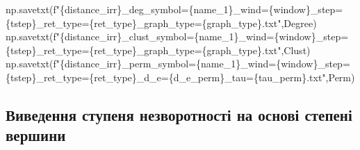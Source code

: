 \documentclass[
  letterpaper,
]{report}
\newenvironment{Shaded}{\begin{snugshade}}{\end{snugshade}}
\newcommand{\NormalTok}[1]{\textcolor[rgb]{0.00,0.23,0.31}{#1}}
\newcommand{\SpecialCharTok}[1]{\textcolor[rgb]{0.37,0.37,0.37}{#1}}
\newcommand{\SpecialStringTok}[1]{\textcolor[rgb]{0.13,0.47,0.30}{#1}}
\begin{document}
\begin{Shaded}
\begin{Highlighting}[]
\NormalTok{np.savetxt(}\SpecialStringTok{f"}\SpecialCharTok{\{}\NormalTok{distance\_irr}\SpecialCharTok{\}}\SpecialStringTok{\_deg\_symbol=}\SpecialCharTok{\{}\NormalTok{name\_1}\SpecialCharTok{\}}\SpecialStringTok{\_wind=}\SpecialCharTok{\{}\NormalTok{window}\SpecialCharTok{\}}\SpecialStringTok{\_step=}\SpecialCharTok{\{}\NormalTok{tstep}\SpecialCharTok{\}}\SpecialStringTok{\_ret\_type=}\SpecialCharTok{\{}\NormalTok{ret\_type}\SpecialCharTok{\}}\SpecialStringTok{\_graph\_type=}\SpecialCharTok{\{}\NormalTok{graph\_type}\SpecialCharTok{\}}\SpecialStringTok{.txt"}\NormalTok{,Degree)}
\NormalTok{np.savetxt(}\SpecialStringTok{f"}\SpecialCharTok{\{}\NormalTok{distance\_irr}\SpecialCharTok{\}}\SpecialStringTok{\_clust\_symbol=}\SpecialCharTok{\{}\NormalTok{name\_1}\SpecialCharTok{\}}\SpecialStringTok{\_wind=}\SpecialCharTok{\{}\NormalTok{window}\SpecialCharTok{\}}\SpecialStringTok{\_step=}\SpecialCharTok{\{}\NormalTok{tstep}\SpecialCharTok{\}}\SpecialStringTok{\_ret\_type=}\SpecialCharTok{\{}\NormalTok{ret\_type}\SpecialCharTok{\}}\SpecialStringTok{\_graph\_type=}\SpecialCharTok{\{}\NormalTok{graph\_type}\SpecialCharTok{\}}\SpecialStringTok{.txt"}\NormalTok{,Clust)}
\NormalTok{np.savetxt(}\SpecialStringTok{f"}\SpecialCharTok{\{}\NormalTok{distance\_irr}\SpecialCharTok{\}}\SpecialStringTok{\_perm\_symbol=}\SpecialCharTok{\{}\NormalTok{name\_1}\SpecialCharTok{\}}\SpecialStringTok{\_wind=}\SpecialCharTok{\{}\NormalTok{window}\SpecialCharTok{\}}\SpecialStringTok{\_step=}\SpecialCharTok{\{}\NormalTok{tstep}\SpecialCharTok{\}}\SpecialStringTok{\_ret\_type=}\SpecialCharTok{\{}\NormalTok{ret\_type}\SpecialCharTok{\}}\SpecialStringTok{\_d\_e=}\SpecialCharTok{\{}\NormalTok{d\_e\_perm}\SpecialCharTok{\}}\SpecialStringTok{\_tau=}\SpecialCharTok{\{}\NormalTok{tau\_perm}\SpecialCharTok{\}}\SpecialStringTok{.txt"}\NormalTok{,Perm)}
\end{Highlighting}
\end{Shaded}

\hypertarget{ux432ux438ux432ux435ux434ux435ux43dux43dux44f-ux441ux442ux443ux43fux435ux43dux44f-ux43dux435ux437ux432ux43eux440ux43eux442ux43dux43eux441ux442ux456-ux43dux430-ux43eux441ux43dux43eux432ux456-ux441ux442ux435ux43fux435ux43dux456-ux432ux435ux440ux448ux438ux43dux438}{%
\subsection{Виведення ступеня незворотності на основі степені
вершини}\label{ux432ux438ux432ux435ux434ux435ux43dux43dux44f-ux441ux442ux443ux43fux435ux43dux44f-ux43dux435ux437ux432ux43eux440ux43eux442ux43dux43eux441ux442ux456-ux43dux430-ux43eux441ux43dux43eux432ux456-ux441ux442ux435ux43fux435ux43dux456-ux432ux435ux440ux448ux438ux43dux438}}
\end{document}
